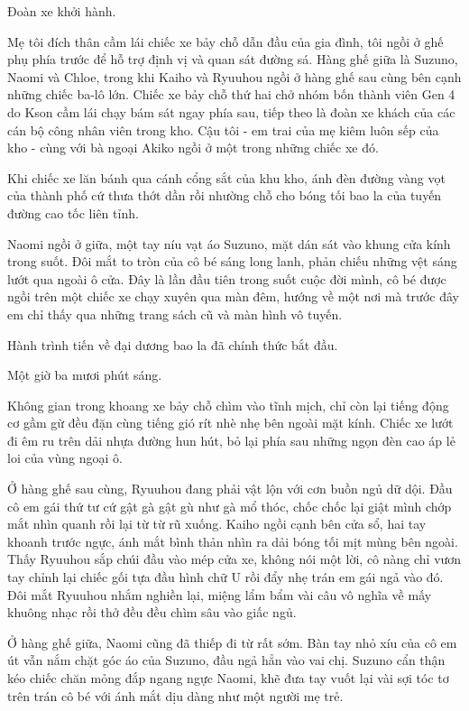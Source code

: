 \documentclass[../main.tex]{subfiles}
\begin{document}
Đoàn xe khởi hành.

Mẹ tôi đích thân cầm lái chiếc xe bảy chỗ dẫn đầu của gia đình, tôi ngồi ở ghế phụ phía trước để hỗ trợ định vị và quan sát đường sá. Hàng ghế giữa là Suzuno, Naomi và Chloe, trong khi Kaiho và Ryuuhou ngồi ở hàng ghế sau cùng bên cạnh những chiếc ba-lô lớn. Chiếc xe bảy chỗ thứ hai chở nhóm bốn thành viên Gen 4 do Kson cầm lái chạy bám sát ngay phía sau, tiếp theo là đoàn xe khách của các cán bộ công nhân viên trong kho. Cậu tôi - em trai của mẹ kiêm luôn sếp của kho - cùng với bà ngoại Akiko ngồi ở một trong những chiếc xe đó.

Khi chiếc xe lăn bánh qua cánh cổng sắt của khu kho, ánh đèn đường vàng vọt của thành phố cứ thưa thớt dần rồi nhường chỗ cho bóng tối bao la của tuyến đường cao tốc liên tỉnh.

Naomi ngồi ở giữa, một tay níu vạt áo Suzuno, mặt dán sát vào khung cửa kính trong suốt. Đôi mắt to tròn của cô bé sáng long lanh, phản chiếu những vệt sáng lướt qua ngoài ô cửa. Đây là lần đầu tiên trong suốt cuộc đời mình, cô bé được ngồi trên một chiếc xe chạy xuyên qua màn đêm, hướng về một nơi mà trước đây em chỉ thấy qua những trang sách cũ và màn hình vô tuyến.

Hành trình tiến về đại dương bao la đã chính thức bắt đầu.

\ct

Một giờ ba mươi phút sáng.

Không gian trong khoang xe bảy chỗ chìm vào tĩnh mịch, chỉ còn lại tiếng động cơ gầm gừ đều đặn cùng tiếng gió rít nhè nhẹ bên ngoài mặt kính. Chiếc xe lướt đi êm ru trên dải nhựa đường hun hút, bỏ lại phía sau những ngọn đèn cao áp lẻ loi của vùng ngoại ô.

Ở hàng ghế sau cùng, Ryuuhou đang phải vật lộn với cơn buồn ngủ dữ dội. Đầu cô em gái thứ tư cứ gật gà gật gù như gà mổ thóc, chốc chốc lại giật mình chớp mắt nhìn quanh rồi lại từ từ rũ xuống. Kaiho ngồi cạnh bên cửa sổ, hai tay khoanh trước ngực, ánh mắt bình thản nhìn ra dải bóng tối mịt mùng bên ngoài. Thấy Ryuuhou sắp chúi đầu vào mép cửa xe, không nói một lời, cô nàng chỉ vươn tay chỉnh lại chiếc gối tựa đầu hình chữ U rồi đẩy nhẹ trán em gái ngả vào đó. Đôi mắt Ryuuhou nhắm nghiền lại, miệng lẩm bẩm vài câu vô nghĩa về mấy khuông nhạc rồi thở đều đều chìm sâu vào giấc ngủ.

Ở hàng ghế giữa, Naomi cũng đã thiếp đi từ rất sớm. Bàn tay nhỏ xíu của cô em út vẫn nắm chặt góc áo của Suzuno, đầu ngả hẳn vào vai chị. Suzuno cẩn thận kéo chiếc chăn mỏng đắp ngang ngực Naomi, khẽ đưa tay vuốt lại vài sợi tóc tơ trên trán cô bé với ánh mắt dịu dàng như một người mẹ trẻ.
\end{document}
